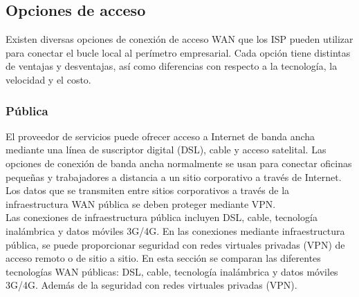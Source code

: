 \documentclass[
	12pt, %
	fleqn, %
	a4paper, %
	oneside, %
]{LegrandOrangeBook}
\begin{document}
\subsection{Opciones de acceso}
Existen diversas opciones de conexión de acceso  WAN que los ISP pueden utilizar para conectar el  bucle local al perímetro empresarial. Cada opción tiene distintas de ventajas y  desventajas, así como diferencias con respecto a la  tecnología, la velocidad y el costo.
\subsubsection{Pública}
El proveedor de servicios puede ofrecer acceso a Internet de banda ancha mediante una línea de suscriptor digital (DSL), cable y acceso satelital. Las opciones de conexión de banda ancha normalmente se usan para conectar oficinas pequeñas y trabajadores a distancia a un sitio corporativo a través de Internet. Los datos que se transmiten entre sitios corporativos a través de la infraestructura WAN pública se deben proteger mediante VPN.\\
Las conexiones de infraestructura pública incluyen DSL, cable, tecnología inalámbrica y datos móviles 3G/4G. En las conexiones mediante infraestructura pública, se puede proporcionar seguridad con redes virtuales privadas (VPN) de acceso remoto o de sitio a sitio. En esta sección se comparan las diferentes tecnologías WAN públicas: DSL, cable, tecnología inalámbrica y datos móviles 3G/4G. Además de la seguridad con redes virtuales privadas (VPN).
\end{document}
